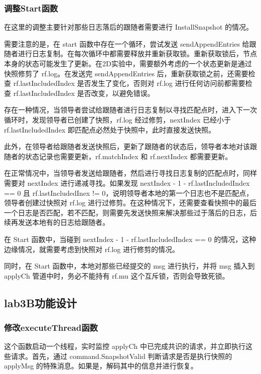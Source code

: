 \documentclass[]{article}
\begin{document}
	\subsubsection{调整Start函数}
	在这里的调整主要针对那些日志落后的跟随者需要进行 InstallSnapshot 的情况。
	
	需要注意的是，在 start 函数中存在一个循环，尝试发送 sendAppendEntries 给跟随者进行日志复制。在每次循环中都需要释放并重新获取锁。重新获取锁后，节点本身的状态可能发生了更新。在2D实验中，需要额外考虑的一个状态更新是通过快照修剪了 rf.log。在发送完 sendAppendEntries 后，重新获取锁之前，还需要检查 rf.lastIncludedIndex 是否发生了变化，否则对 rf.log 进行任何访问前都需要检查 rf.lastIncludedIndex 是否改变，以避免错误。
	
	存在一种情况，当领导者尝试给跟随者进行日志复制以寻找匹配点时，进入下一次循环时，发现领导者已创建了快照，rf.log 经过修剪，nextIndex 已经小于 rf.lastIncludedIndex 即匹配点必然处于快照中，此时直接发送快照。
	
	此外，在领导者给跟随者发送快照后，更新了跟随者的状态后，领导者本地对该跟随者的状态记录也需要更新，rf.matchIndex 和 rf.nextIndex 都需要更新。
	
	在正常情况中，当领导者发送给跟随者，然后进行寻找日志复制的匹配点时，同样需要对 nextIndex 进行递减寻找。如果发现 nextIndex - 1 - rf.lastIncludedIndex == 0 且 rf.lastIncludedInex != 0，说明领导者本地的第一个日志也不是匹配点，领导者创建过快照对 rf.log 进行过修剪。在这种情况下，还需要查看快照中的最后一个日志是否匹配，若不匹配，则需要先发送快照来解决那些过于落后的日志，后续再发送本地有的日志给跟随者。
	
	在 Start 函数中，当碰到 nextIndex - 1 - rf.lastIncludedIndex == 0 的情况，这种边缘情况，就需要考虑到快照对 rf.log 进行修剪的情况。
	
	同时，在 Start 函数中，本地对那些已经提交的 msg 进行执行，并将 msg 插入到 applyCh 管道中时，务必不能持有 rf.mu 这个互斥锁，否则会导致死锁。
	
	\subsection{lab3B功能设计}
	\subsubsection{修改executeThread函数}
	这个函数启动一个线程，实时监控 applyCh 中已完成共识的请求，并立即执行这些请求。首先，通过 command.SnapshotValid 判断请求是否是执行快照的 applyMsg 的特殊消息。如果是，解码其中的信息并进行恢复。
	
\end{document}
